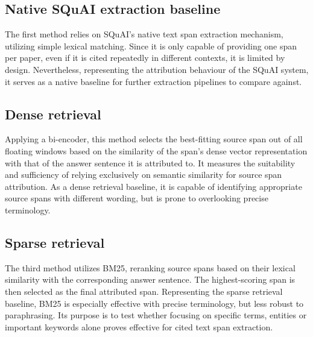 \subsection{Native SQuAI extraction baseline}
The first method relies on SQuAI's native text span extraction mechanism, utilizing simple lexical matching. Since it is only capable of providing one span per paper, even if it is cited repeatedly in different contexts, it is limited by design. Nevertheless, representing the attribution behaviour of the SQuAI system, it serves as a native baseline for further extraction pipelines to compare against.
\subsection{Dense retrieval}
Applying a bi-encoder, this method selects the best-fitting source span out of all floating windows based on the similarity of the span's dense vector representation with that of the answer sentence it is attributed to. It measures the suitability and sufficiency of relying exclusively on semantic similarity for source span attribution. As a dense retrieval baseline, it is capable of identifying appropriate source spans with different wording, but is prone to overlooking precise terminology. 
\subsection{Sparse retrieval}
The third method utilizes BM25, reranking source spans based on their lexical similarity with the corresponding answer sentence. The highest-scoring span is then selected as the final attributed span. Representing the sparse retrieval baseline, BM25 is especially effective with precise terminology, but less robust to paraphrasing. Its purpose is to test whether focusing on specific terms, entities or important keywords alone proves effective for cited text span extraction.

